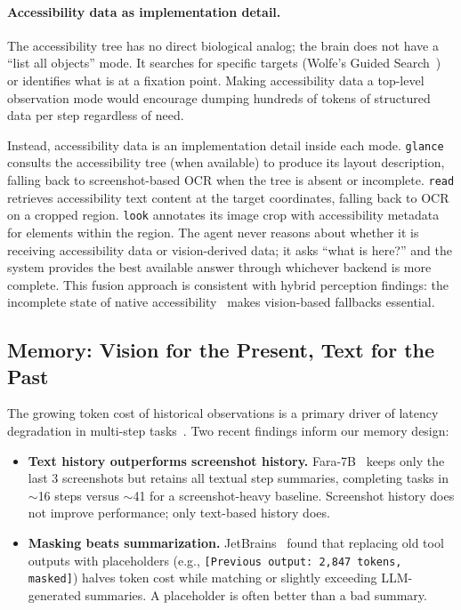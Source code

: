 \documentclass[11pt,a4paper]{article}
\begin{document}
\paragraph{Accessibility data as implementation detail.}
The accessibility tree has no direct biological analog; the brain does not
have a ``list all objects'' mode. It searches for specific targets (Wolfe's
Guided Search~\cite{wolfe-guided-search}) or identifies what is at a fixation
point. Making accessibility data a top-level observation mode would encourage
dumping hundreds of tokens of structured data per step regardless of need.

Instead, accessibility data is an implementation detail inside each
mode. \texttt{glance} consults the accessibility tree (when available) to
produce its layout description, falling back to screenshot-based OCR when the
tree is absent or incomplete. \texttt{read} retrieves accessibility text
content at the target coordinates, falling back to OCR on a cropped region.
\texttt{look} annotates its image crop with accessibility metadata for
elements within the region. The agent never reasons about whether it is
receiving accessibility data or vision-derived data; it asks ``what is here?''
and the system provides the best available answer through whichever backend is
more complete. This fusion approach is consistent with hybrid perception
findings: the incomplete state of native accessibility~\cite{screen2ax} makes vision-based
fallbacks essential.

\subsection{Memory: Vision for the Present, Text for the Past}
\label{sec:memory}

The growing token cost of historical observations is a primary driver of
latency degradation in multi-step tasks~\cite{osworld-human}. Two recent findings inform our memory design:

\begin{itemize}[leftmargin=*,itemsep=2pt]
  \item \textbf{Text history outperforms screenshot history.}
    Fara-7B~\cite{fara-7b} keeps only the last 3 screenshots but retains
    all textual step summaries, completing tasks in $\sim$16 steps versus
    $\sim$41 for a screenshot-heavy baseline. Screenshot history does not improve performance; only text-based history does.
  \item \textbf{Masking beats summarization.}
    JetBrains~\cite{jetbrains-complexity-trap} found that replacing old tool
    outputs with placeholders (e.g., \texttt{[Previous output: 2,847 tokens,
    masked]}) halves token cost while matching or slightly exceeding
    LLM-generated summaries. A placeholder is often better than a bad summary.
\end{itemize}
\end{document}

